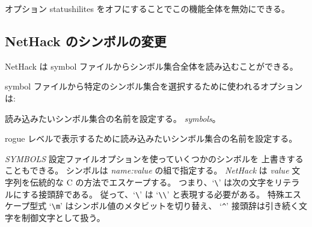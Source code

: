 オプション statushilites をオフにすることでこの機能全体を無効にできる。


\subsection*{NetHack のシンボルの変更}

NetHack は symbol ファイルからシンボル集合全体を読み込むことができる。

symbol ファイルから特定のシンボル集合を選択するために使われるオプションは:

\blist{}
\item[\ib{symset}]
読み込みたいシンボル集合の名前を設定する。
{\it symbols\/}。

\item[\ib{roguesymset}]
rogue レベルで表示するために読み込みたいシンボル集合の名前を設定する。
\elist

{\it SYMBOLS\/} 設定ファイルオプションを使っていくつかのシンボルを
上書きすることもできる。
シンボルは {\it name:value\/} の組で指定する。
{\it NetHack\/} は {\it value\/} 文字列を伝統的な C の方法でエスケープする。
つまり、`\verb+\+' は次の文字をリテラルにする接頭辞である。
従って、`\verb+\+' は `\verb+\\+' と表現する必要がある。
特殊エスケープ型式 `\verb+\m+' はシンボル値のメタビットを切り替え、
`{\tt \^{}}' 接頭辞は引き続く文字を制御文字として扱う。

